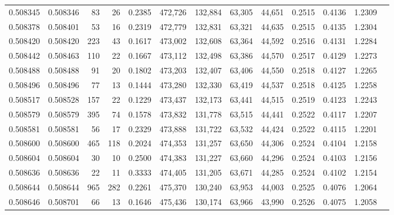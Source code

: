 \begin{tabular}{rrrrrrrrrrrrr}
0.508345 & 0.508346 &    83 &    26 &                                     0.2385 & 472,726 & 132,884 &  63,305 &  44,651 & 0.2515 & 0.4136 & 1.2309 \\
0.508378 & 0.508401 &    53 &    16 &                                     0.2319 & 472,779 & 132,831 &  63,321 &  44,635 & 0.2515 & 0.4135 & 1.2304 \\
0.508420 & 0.508420 &   223 &    43 &                                     0.1617 & 473,002 & 132,608 &  63,364 &  44,592 & 0.2516 & 0.4131 & 1.2284 \\
0.508442 & 0.508463 &   110 &    22 &                                     0.1667 & 473,112 & 132,498 &  63,386 &  44,570 & 0.2517 & 0.4129 & 1.2273 \\
0.508488 & 0.508488 &    91 &    20 &                                     0.1802 & 473,203 & 132,407 &  63,406 &  44,550 & 0.2518 & 0.4127 & 1.2265 \\
0.508496 & 0.508496 &    77 &    13 &                                     0.1444 & 473,280 & 132,330 &  63,419 &  44,537 & 0.2518 & 0.4125 & 1.2258 \\
0.508517 & 0.508528 &   157 &    22 &                                     0.1229 & 473,437 & 132,173 &  63,441 &  44,515 & 0.2519 & 0.4123 & 1.2243 \\
0.508579 & 0.508579 &   395 &    74 &                                     0.1578 & 473,832 & 131,778 &  63,515 &  44,441 & 0.2522 & 0.4117 & 1.2207 \\
0.508581 & 0.508581 &    56 &    17 &                                     0.2329 & 473,888 & 131,722 &  63,532 &  44,424 & 0.2522 & 0.4115 & 1.2201 \\
0.508600 & 0.508600 &   465 &   118 &                                     0.2024 & 474,353 & 131,257 &  63,650 &  44,306 & 0.2524 & 0.4104 & 1.2158 \\
0.508604 & 0.508604 &    30 &    10 &                                     0.2500 & 474,383 & 131,227 &  63,660 &  44,296 & 0.2524 & 0.4103 & 1.2156 \\
0.508636 & 0.508636 &    22 &    11 &                                     0.3333 & 474,405 & 131,205 &  63,671 &  44,285 & 0.2524 & 0.4102 & 1.2154 \\
0.508644 & 0.508644 &   965 &   282 &                                     0.2261 & 475,370 & 130,240 &  63,953 &  44,003 & 0.2525 & 0.4076 & 1.2064 \\
0.508646 & 0.508701 &    66 &    13 &                                     0.1646 & 475,436 & 130,174 &  63,966 &  43,990 & 0.2526 & 0.4075 & 1.2058 \\

\end{tabular}
